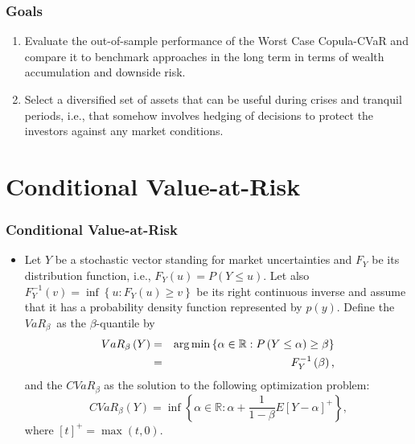 \documentclass[pdf,9pt,xcolor=dvipsnames,hide notes]{beamer}
\begin{document}
\begin{frame}[label=frame2]
\frametitle{Goals}

\begin{enumerate}[(1)]
\justifying

\item Evaluate the out-of-sample performance of the Worst Case Copula-CVaR and compare it to benchmark approaches in the long term in terms of wealth accumulation and
downside risk.

\vspace{0.3cm}

\item Select a diversified set of assets that can be
useful during crises and tranquil periods, i.e., that somehow involves hedging of decisions
to protect the investors against any market conditions.

\end{enumerate}

\end{frame}

\section{Conditional Value-at-Risk}
\begin{frame}[label=frame2b2]
	\frametitle{Conditional Value-at-Risk}
	\begin{itemize}
		\justifying
		
		\item 	Let $Y$ be a stochastic vector standing for market uncertainties and $F_{Y}$
		be its distribution function, i.e., $F_{Y}\left( u\right) =P\left( Y\leq
		u\right) $. Let also $F_{Y}^{-1}\left( v\right) =\inf \left\{ u:F_{Y}\left(
		u\right) \geq v\right\} $ be its right continuous inverse and assume that it
		has a probability density function represented by $p(y)$. Define the $VaR_{\beta
		}$\thinspace\ as the $\beta $-quantile by
		\begin{eqnarray}
		VaR_{\beta }\left( Y\right) &=& \arg \min \left\{ \alpha \in
		\mathbb{R}
		:P\left( Y\leq \alpha \right) \geq \beta \right\}  \label{one} \\
		&=&F_{Y}^{-1}\left( \beta \right) \text{,}  \notag
		\end{eqnarray}%
		and the $CVaR_{\beta }$ as the solution to the following optimization
		problem:
		\begin{equation}
		CVaR_{\beta }\left( Y\right) =\inf \left\{ \alpha \in
		\mathbb{R}
		:\alpha +\frac{1}{1-\beta }E\left[ Y-\alpha \right] ^{+}\right\} \text{,}
		\label{two}
		\end{equation}%
		where $\left[ t\right] ^{+}=\max \left( t,0\right) $.
		
	\end{itemize}
	
\end{frame}
\end{document}

